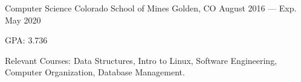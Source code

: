 

\begin{cventries}

  \cventry
    {Computer Science} %
    {Colorado School of Mines} %
    {Golden, CO} %
    {August 2016 --- Exp. May 2020} %
    {
      \begin{cvitems} %
        \item {GPA\@: 3.736}
        \item {Relevant Courses: Data Structures, Intro to Linux, Software Engineering, Computer Organization, Database Management.}
      \end{cvitems}
    }

\end{cventries}
